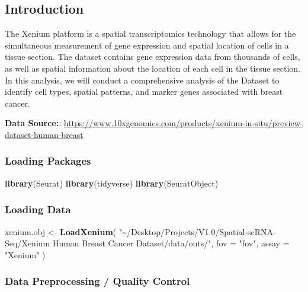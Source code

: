\documentclass[
]{article}
\newenvironment{Shaded}{\begin{snugshade}}{\end{snugshade}}
\newcommand{\AttributeTok}[1]{\textcolor[rgb]{0.13,0.29,0.53}{#1}}
\newcommand{\FunctionTok}[1]{\textcolor[rgb]{0.13,0.29,0.53}{\textbf{#1}}}
\newcommand{\NormalTok}[1]{#1}
\newcommand{\OtherTok}[1]{\textcolor[rgb]{0.56,0.35,0.01}{#1}}
\newcommand{\StringTok}[1]{\textcolor[rgb]{0.31,0.60,0.02}{#1}}
\begin{document}
\subsection{Introduction}\label{introduction}

The Xenium platform is a spatial transcriptomics technology that allows
for the simultaneous measurement of gene expression and spatial location
of cells in a tissue section. The dataset contains gene expression data
from thousands of cells, as well as spatial information about the
location of each cell in the tissue section. In this analysis, we will
conduct a comprehensive analysis of the Dataset to identify cell types,
spatial patterns, and marker genes associated with breast cancer.

\textbf{Data Source:}:
\url{https://www.10xgenomics.com/products/xenium-in-situ/preview-dataset-human-breast}

\subsubsection{Loading Packages}\label{loading-packages}

\begin{Shaded}
\begin{Highlighting}[]
\FunctionTok{library}\NormalTok{(Seurat)}
\FunctionTok{library}\NormalTok{(tidyverse)}
\FunctionTok{library}\NormalTok{(SeuratObject)}
\end{Highlighting}
\end{Shaded}

\subsubsection{Loading Data}\label{loading-data}

\begin{Shaded}
\begin{Highlighting}[]
\NormalTok{xenium.obj }\OtherTok{\textless{}{-}} \FunctionTok{LoadXenium}\NormalTok{(}
  \StringTok{"\textasciitilde{}/Desktop/Projects/V1.0/Spatial{-}scRNA{-}Seq/Xenium Human Breast Cancer Dataset/data/outs/"}\NormalTok{,}
  \AttributeTok{fov =} \StringTok{"fov"}\NormalTok{, }
  \AttributeTok{assay =} \StringTok{"Xenium"}
\NormalTok{)}
\end{Highlighting}
\end{Shaded}

\subsubsection{Data Preprocessing / Quality
Control}\label{data-preprocessing-quality-control}
\end{document}
